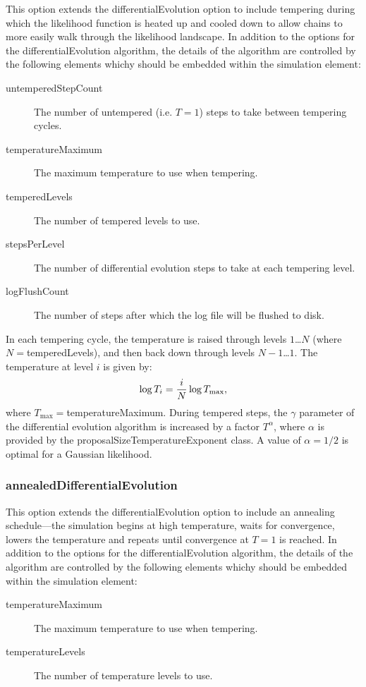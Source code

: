 This option extends the {\normalfont \ttfamily differentialEvolution} option to include tempering during which the likelihood function is heated up and cooled down to allow chains to more easily walk through the likelihood landscape. In addition to the options for the {\normalfont \ttfamily differentialEvolution} algorithm, the details of the algorithm are controlled by the following elements whichy should be embedded within the {\normalfont \ttfamily simulation} element:
\begin{description}
\item[{\normalfont \ttfamily untemperedStepCount}] The number of untempered (i.e. $T=1$) steps to take between tempering cycles.
\item[{\normalfont \ttfamily temperatureMaximum}] The maximum temperature to use when tempering.
\item[{\normalfont \ttfamily temperedLevels}] The number of tempered levels to use.
\item[{\normalfont \ttfamily stepsPerLevel}] The number of differential evolution steps to take at each tempering level.
\item[{\normalfont \ttfamily logFlushCount}] The number of steps after which the log file will be flushed to disk.
\end{description}

In each tempering cycle, the temperature is raised through levels $1$\ldots$N$ (where $N=${\normalfont \ttfamily temperedLevels}), and then back down through levels $N-1$\ldots$1$. The temperature at level $i$ is given by:
\begin{equation}
\log T_i = {i \over N} \log T_\mathrm{max},
\end{equation}
where $T_\mathrm{max}=${\normalfont \ttfamily temperatureMaximum}. During tempered steps, the $\gamma$ parameter of the differential evolution algorithm is increased by a factor $T^\alpha$, where $\alpha$ is provided by the {\normalfont \ttfamily proposalSizeTemperatureExponent} class. A value of $\alpha=1/2$ is optimal for a Gaussian likelihood.

\subsubsection{{\normalfont \ttfamily annealedDifferentialEvolution}}

This option extends the {\normalfont \ttfamily differentialEvolution} option to include an annealing schedule---the simulation begins at high temperature, waits for convergence, lowers the temperature and repeats until convergence at $T=1$ is reached. In addition to the options for the {\normalfont \ttfamily differentialEvolution} algorithm, the details of the algorithm are controlled by the following elements whichy should be embedded within the {\normalfont \ttfamily simulation} element:
\begin{description}
\item[{\normalfont \ttfamily temperatureMaximum}] The maximum temperature to use when tempering.
\item[{\normalfont \ttfamily temperatureLevels}] The number of temperature levels to use.
\end{description}

